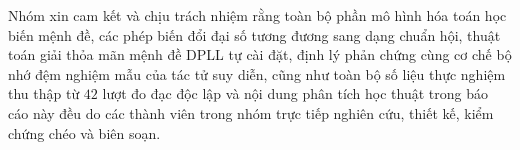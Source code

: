 Nhóm xin cam kết và chịu trách nhiệm rằng toàn bộ phần mô hình hóa toán học biến
mệnh đề, các phép biến đổi đại số tương đương sang dạng chuẩn hội, thuật toán giải
thỏa mãn mệnh đề DPLL tự cài đặt, định lý phản chứng cùng cơ chế bộ nhớ đệm nghiệm
mẫu của tác tử suy diễn, cũng như toàn bộ số liệu thực nghiệm thu thập từ $42$
lượt đo đạc độc lập và nội dung phân tích học thuật trong báo cáo này đều do các
thành viên trong nhóm trực tiếp nghiên cứu, thiết kế, kiểm chứng chéo và biên
soạn.

